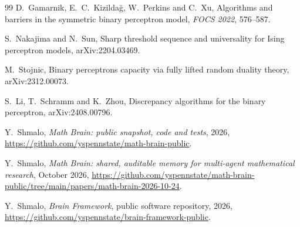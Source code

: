 \documentclass[11pt]{article}
\theoremstyle{remark}
\begin{document}
\begin{thebibliography}{99}
D.~Gamarnik, E.~C.~Kizilda\u{g}, W.~Perkins and C.~Xu,
Algorithms and barriers in the symmetric binary perceptron model,
\emph{FOCS 2022}, 576--587.

S.~Nakajima and N.~Sun,
Sharp threshold sequence and universality for Ising perceptron
models,
arXiv:2204.03469.

M.~Stojnic,
Binary perceptrons capacity via fully lifted random duality theory,
arXiv:2312.00073.

S.~Li, T.~Schramm and K.~Zhou,
Discrepancy algorithms for the binary perceptron,
arXiv:2408.00796.

 Y.~Shmalo, \emph{Math Brain: public snapshot, code and tests}, 2026, \url{https://github.com/yspennstate/math-brain-public}.

 Y.~Shmalo, \emph{Math Brain: shared, auditable memory for multi-agent mathematical research}, October 2026, \url{https://github.com/yspennstate/math-brain-public/tree/main/papers/math-brain-2026-10-24}.

 Y.~Shmalo, \emph{Brain Framework}, public software repository, 2026, \url{https://github.com/yspennstate/brain-framework-public}.

\end{thebibliography}
\end{document}
